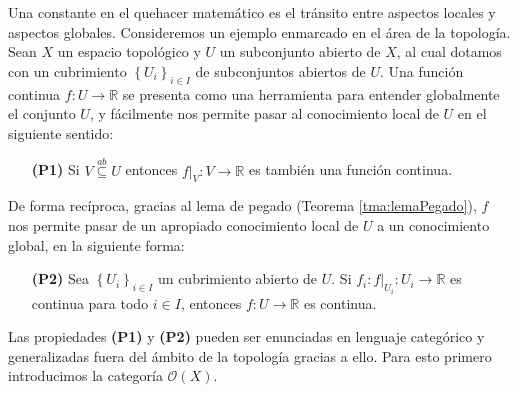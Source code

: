 Una constante en el quehacer matemático es el tránsito entre aspectos locales y aspectos globales. Consideremos un ejemplo enmarcado en el área de la topología. Sean $X$ un espacio topológico y $U$ un subconjunto abierto de $X$, al cual dotamos con un cubrimiento $\left\lbrace U_i\right\rbrace_{i\in I}$ de subconjuntos abiertos de $U$. Una función continua $f:U\to \mathbb{R}$ se presenta como una herramienta para entender globalmente el conjunto $U$, y fácilmente nos permite pasar al conocimiento local de $U$ en el siguiente sentido:
\begin{itemize}
   \item[\textbf{(P1)}] Si $V\stackrel{ab}\subseteq U$ entonces $f|_V:V\to\mathbb{R}$ es también una función continua. 
\end{itemize}
De forma recíproca, gracias al lema de pegado (Teorema \ref{tma:lemaPegado}), $f$ nos permite pasar de un apropiado conocimiento local de $U$ a un conocimiento global, en la siguiente forma:
\begin{itemize}
   \item[\textbf{(P2)}] Sea $\left\lbrace U_i\right\rbrace_{i\in I}$ un cubrimiento abierto de $U$. Si $f_i:f|_{U_i}:U_i\to\mathbb{R}$ es continua para todo $i\in I$, entonces $f:U\to\mathbb{R}$ es continua.
\end{itemize}
Las propiedades \textbf{(P1)} y \textbf{(P2)} pueden ser enunciadas en lenguaje categórico y generalizadas fuera del ámbito de la topología gracias a ello. Para esto primero introducimos la categoría $\mathcal{O}(X)$.
